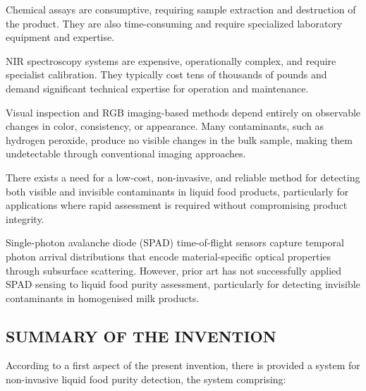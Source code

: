 \documentclass[11pt,a4paper]{article}
\begin{document}
Chemical assays are consumptive, requiring sample extraction and destruction of the product. They are also time-consuming and require specialized laboratory equipment and expertise.

NIR spectroscopy systems are expensive, operationally complex, and require specialist calibration. They typically cost tens of thousands of pounds and demand significant technical expertise for operation and maintenance.

Visual inspection and RGB imaging-based methods depend entirely on observable changes in color, consistency, or appearance. Many contaminants, such as hydrogen peroxide, produce no visible changes in the bulk sample, making them undetectable through conventional imaging approaches.

There exists a need for a low-cost, non-invasive, and reliable method for detecting both visible and invisible contaminants in liquid food products, particularly for applications where rapid assessment is required without compromising product integrity.

Single-photon avalanche diode (SPAD) time-of-flight sensors capture temporal photon arrival distributions that encode material-specific optical properties through subsurface scattering. However, prior art has not successfully applied SPAD sensing to liquid food purity assessment, particularly for detecting invisible contaminants in homogenised milk products.

\vspace{0.5em}
\subsection{SUMMARY OF THE INVENTION}

According to a first aspect of the present invention, there is provided a system for non-invasive liquid food purity detection, the system comprising:
\end{document}
